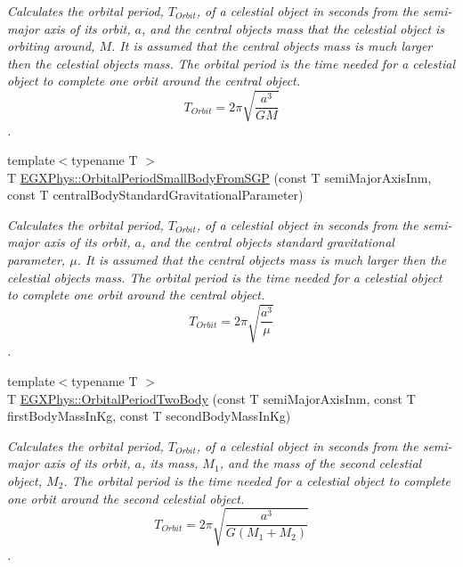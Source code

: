 \begin{DoxyCompactItemize}
\begin{DoxyCompactList}\small\item\em Calculates the orbital period, $T_{Orbit}$, of a celestial object in seconds from the semi-\/major axis of its orbit, $a$, and the central object\textquotesingle{}s mass that the celestial object is orbiting around, $M$. It is assumed that the central object\textquotesingle{}s mass is much larger then the celestial objects mass. The orbital period is the time needed for a celestial object to complete one orbit around the central object. \[ T_{Orbit}=2\pi\sqrt{\dfrac{a^3}{GM}}\]. \end{DoxyCompactList}\item 
{\footnotesize template$<$typename T $>$ }\\T \mbox{\hyperlink{group___e_g_x_phys-_astrophysic-_orbital_period_gab3773d2109aef45ef4649b56e36d13f3}{E\+G\+X\+Phys\+::\+Orbital\+Period\+Small\+Body\+From\+S\+GP}} (const T semi\+Major\+Axis\+Inm, const T central\+Body\+Standard\+Gravitational\+Parameter)
\begin{DoxyCompactList}\small\item\em Calculates the orbital period, $T_{Orbit}$, of a celestial object in seconds from the semi-\/major axis of its orbit, $a$, and the central object\textquotesingle{}s standard gravitational parameter, $\mu$. It is assumed that the central object\textquotesingle{}s mass is much larger then the celestial objects mass. The orbital period is the time needed for a celestial object to complete one orbit around the central object. \[ T_{Orbit}=2\pi\sqrt{\dfrac{a^3}{\mu}}\]. \end{DoxyCompactList}\item 
{\footnotesize template$<$typename T $>$ }\\T \mbox{\hyperlink{group___e_g_x_phys-_astrophysic-_orbital_period_ga60d2541fdf2108542e52879ae907d81c}{E\+G\+X\+Phys\+::\+Orbital\+Period\+Two\+Body}} (const T semi\+Major\+Axis\+Inm, const T first\+Body\+Mass\+In\+Kg, const T second\+Body\+Mass\+In\+Kg)
\begin{DoxyCompactList}\small\item\em Calculates the orbital period, $T_{Orbit}$, of a celestial object in seconds from the semi-\/major axis of its orbit, $a$, its mass, $M_1$, and the mass of the second celestial object, $M_2$. The orbital period is the time needed for a celestial object to complete one orbit around the second celestial object. \[ T_{Orbit}=2\pi\sqrt{\dfrac{a^3}{G(M_1 + M_2)}}\]. \end{DoxyCompactList}\item 

\end{DoxyCompactItemize}

